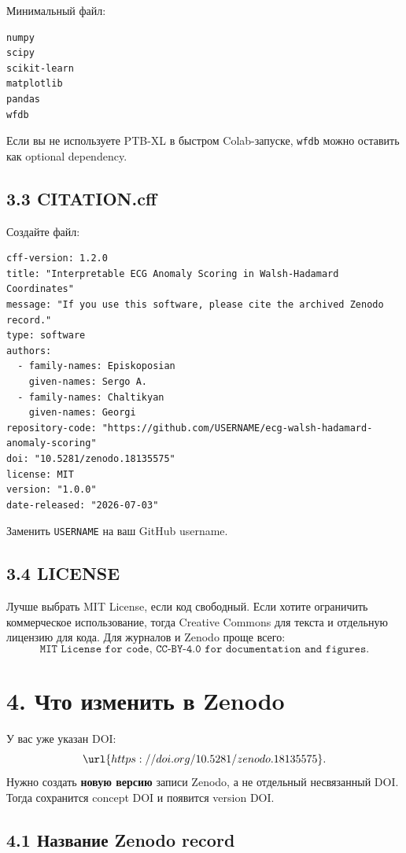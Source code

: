 \documentclass[12pt,a4paper]{article}
\begin{document}
Минимальный файл:

\begin{verbatim}
numpy
scipy
scikit-learn
matplotlib
pandas
wfdb
\end{verbatim}

Если вы не используете PTB-XL в быстром Colab-запуске, \texttt{wfdb} можно оставить как optional dependency.

\subsection*{3.3 CITATION.cff}

Создайте файл:

\begin{verbatim}
cff-version: 1.2.0
title: "Interpretable ECG Anomaly Scoring in Walsh-Hadamard Coordinates"
message: "If you use this software, please cite the archived Zenodo record."
type: software
authors:
  - family-names: Episkoposian
    given-names: Sergo A.
  - family-names: Chaltikyan
    given-names: Georgi
repository-code: "https://github.com/USERNAME/ecg-walsh-hadamard-anomaly-scoring"
doi: "10.5281/zenodo.18135575"
license: MIT
version: "1.0.0"
date-released: "2026-07-03"
\end{verbatim}

Заменить \texttt{USERNAME} на ваш GitHub username.

\subsection*{3.4 LICENSE}

Лучше выбрать MIT License, если код свободный. Если хотите ограничить коммерческое использование, тогда Creative Commons для текста и отдельную лицензию для кода. Для журналов и Zenodo проще всего:
\[
\texttt{MIT License for code, CC-BY-4.0 for documentation and figures.}
\]

\section*{4. Что изменить в Zenodo}

У вас уже указан DOI:
\[
\url{https://doi.org/10.5281/zenodo.18135575}.
\]
Нужно создать \textbf{новую версию} записи Zenodo, а не отдельный несвязанный DOI. Тогда сохранится concept DOI и появится version DOI.

\subsection*{4.1 Название Zenodo record}
\end{document}
